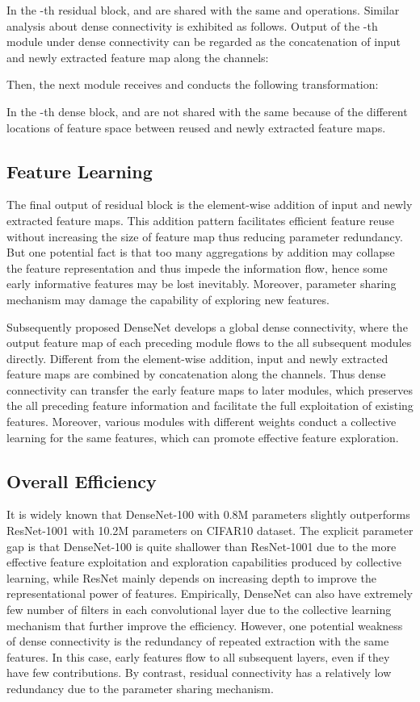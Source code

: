 \documentclass[letterpaper]{article}
\begin{document}
 	In the -th residual block,  and  are shared with the same  and operations. Similar analysis about dense connectivity is exhibited as follows. Output of the -th module under dense connectivity can be regarded as the concatenation of input  and newly extracted feature map  along the channels:
 	
 	Then, the next module receives  and conducts the following transformation:
 	
 	
 	In the -th dense block,  and  are not shared with the same  because of the different locations of feature space between reused and newly extracted feature maps.
 	
 	\subsection{Feature Learning}
 	The final output of residual block is the element-wise addition of input  and newly extracted feature maps. This addition pattern facilitates efficient feature reuse without increasing the size of feature map thus reducing parameter redundancy. But one potential fact is that too many aggregations by addition may collapse the feature representation and thus impede the information flow, hence some early informative features may be lost inevitably. Moreover, parameter sharing mechanism may damage the capability of exploring new features.
 	
 	Subsequently proposed DenseNet develops a global dense connectivity, where the output feature map of each preceding module flows to the all subsequent modules directly. Different from the element-wise addition, input and newly extracted feature maps are combined by concatenation along the channels. Thus dense connectivity can transfer the early feature maps to later modules, which preserves the all preceding feature information and facilitate the full exploitation of existing features. Moreover, various modules with different weights conduct a collective learning for the same features, which can promote effective feature exploration.
 	\subsection{Overall Efficiency} 	
 	It is widely known that DenseNet-100 with 0.8M parameters slightly outperforms ResNet-1001 with 10.2M parameters on CIFAR10 dataset. The explicit parameter gap is that DenseNet-100 is quite shallower than ResNet-1001 due to the more effective feature exploitation and exploration capabilities produced by collective learning, while ResNet mainly depends on increasing depth to improve the representational power of features. Empirically, DenseNet can also have extremely few number of filters in each convolutional layer due to the collective learning mechanism that further improve the efficiency. However, one potential weakness of dense connectivity is the redundancy of repeated extraction with the same features. In this case, early features flow to all subsequent layers, even if they have few contributions. By contrast, residual connectivity has a relatively low redundancy due to the parameter sharing mechanism.
 	
\end{document}
